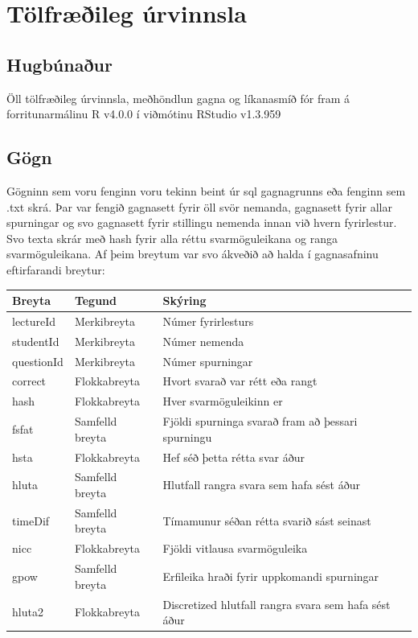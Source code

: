 \documentclass[
  12pt,
]{article}
\begin{document}
\hypertarget{tuxf6lfruxe6uxf0ileg-uxfarvinnsla}{%
\section{Tölfræðileg úrvinnsla}\label{tuxf6lfruxe6uxf0ileg-uxfarvinnsla}}

\hypertarget{hugbuxfanauxf0ur}{%
\subsection{Hugbúnaður}\label{hugbuxfanauxf0ur}}

Öll tölfræðileg úrvinnsla, meðhöndlun gagna og líkanasmíð fór fram á forritunarmálinu
R v4.0.0 í viðmótinu RStudio v1.3.959

\hypertarget{guxf6gn}{%
\subsection{Gögn}\label{guxf6gn}}

Gögninn sem voru fenginn voru tekinn beint úr sql gagnagrunns eða fenginn sem .txt skrá. Þar var fengið gagnasett fyrir öll svör nemanda, gagnasett fyrir allar spurningar og svo gagnasett fyrir stillingu nemenda innan við hvern fyrirlestur. Svo texta skrár með hash fyrir alla réttu svarmöguleikana og ranga svarmöguleikana. Af þeim breytum var svo ákveðið að halda í gagnasafninu eftirfarandi breytur:

\begin{table}[H]
\centering
\begin{tabular}{lll}
\toprule
Breyta & Tegund & Skýring\\
\midrule
lectureId & Merkibreyta & Númer fyrirlesturs\\
studentId & Merkibreyta & Númer nemenda\\
questionId & Merkibreyta & Númer spurningar\\
correct & Flokkabreyta & Hvort svarað var rétt eða rangt\\
hash & Flokkabreyta & Hver svarmöguleikinn er\\
\addlinespace
fsfat & Samfelld breyta & Fjöldi spurninga svarað fram að þessari spurningu\\
hsta & Flokkabreyta & Hef séð þetta rétta svar áður\\
hluta & Samfelld breyta & Hlutfall rangra svara sem hafa sést áður\\
timeDif & Samfelld breyta & Tímamunur séðan rétta svarið sást seinast\\
nicc & Flokkabreyta & Fjöldi vitlausa svarmöguleika\\
\addlinespace
gpow & Samfelld breyta & Erfileika hraði fyrir uppkomandi spurningar\\
hluta2 & Flokkabreyta & Discretized hlutfall rangra svara sem hafa sést áður\\
\bottomrule
\end{tabular}
\end{table}
\end{document}
